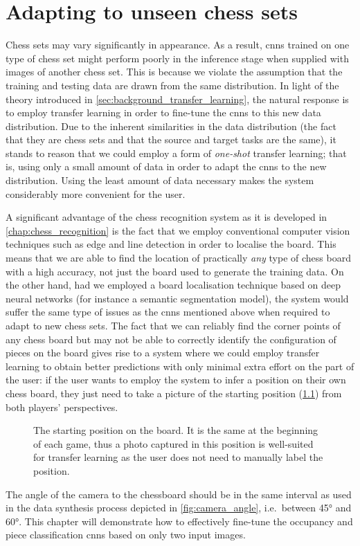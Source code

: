 \documentclass[../report.tex]{subfiles}
\begin{document}
\chapter{Adapting to unseen chess sets}
\label{chap:adapting}

Chess sets may vary significantly in appearance. 
As a result, \glspl{cnn} trained on one type of chess set might perform poorly in the inference stage when supplied with images of another chess set. 
This is because we violate the assumption that the training and testing data are drawn from the same distribution.
In light of the theory introduced in \cref{sec:background_transfer_learning}, the natural response is to employ transfer learning in order to fine-tune the \glspl{cnn} to this new data distribution.
Due to the inherent similarities in the data distribution (the fact that they are chess sets and that the source and target tasks are the same), it stands to reason that we could employ a form of \emph{one-shot} transfer learning; 
that is, using only a small amount of data in order to adapt the \glspl{cnn} to the new distribution.
Using the least amount of data necessary makes the system considerably more convenient for the user.

A significant advantage of the chess recognition system as it is developed in \cref{chap:chess_recognition} is the fact that we employ conventional computer vision techniques such as edge and line detection in order to localise the board.
This means that we are able to find the location of practically \emph{any} type of chess board with a high accuracy, not just the board used to generate the training data.
On the other hand, had we employed a board localisation technique based on deep neural networks (for instance a semantic segmentation model), the system would suffer the same type of issues as the \glspl{cnn} mentioned above when required to adapt to new chess sets.
The fact that we can reliably find the corner points of any chess board but may not be able to correctly identify the configuration of pieces on the board gives rise to a system where we could employ transfer learning to obtain better predictions with only minimal extra effort on the part of the user:
if the user wants to employ the system to infer a position on their own chess board, they just need to take a picture of the starting position (\cref{fig:chess_start_position}) from both players' perspectives.
\begin{figure}[h]
    \centering
    \newgame
    \showboard
    \caption[The starting position on the board.]{The starting position on the board. It is the same at the beginning of each game, thus a photo captured in this position is well-suited for transfer learning as the user does not need to manually label the position.}
    \label{fig:chess_start_position}
\end{figure}
The angle of the camera to the chessboard should be in the same interval as used in the data synthesis process depicted in \cref{fig:camera_angle}, i.e.\ between 45° and 60°.
This chapter will demonstrate how to effectively fine-tune the occupancy and piece classification \glspl{cnn} based on only two input images.
\end{document}
